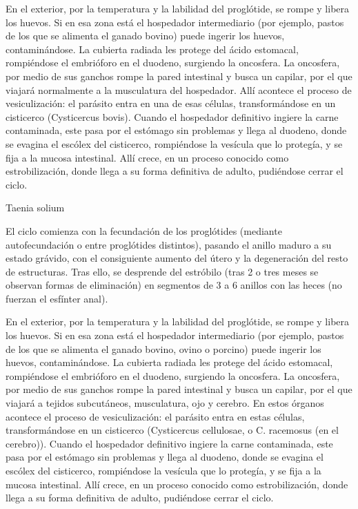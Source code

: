 En el exterior, por la temperatura y la labilidad del proglótide, se rompe y libera los huevos. Si en esa zona está el hospedador intermediario (por ejemplo, pastos de los que se alimenta el ganado bovino) puede ingerir los huevos, contaminándose. La cubierta radiada les protege del ácido estomacal, rompiéndose el embrióforo en el duodeno, surgiendo la oncosfera. La oncosfera, por medio de sus ganchos rompe la pared intestinal y busca un capilar, por el que viajará normalmente a la musculatura del hospedador. Allí acontece el proceso de vesiculización: el parásito entra en una de esas células, transformándose en un cisticerco (Cysticercus bovis). Cuando el hospedador definitivo ingiere la carne contaminada, este pasa por el estómago sin problemas y llega al duodeno, donde se evagina el escólex del cisticerco, rompiéndose la vesícula que lo protegía, y se fija a la mucosa intestinal. Allí crece, en un proceso conocido como estrobilización, donde llega a su forma definitiva de adulto, pudiéndose cerrar el ciclo.

Taenia solium

El ciclo comienza con la fecundación de los proglótides (mediante autofecundación o entre proglótides distintos), pasando el anillo maduro a su estado grávido, con el consiguiente aumento del útero y la degeneración del resto de estructuras. Tras ello, se desprende del estróbilo (tras 2 o tres meses se observan formas de eliminación) en segmentos de 3 a 6 anillos con las heces (no fuerzan el esfínter anal). 

En el exterior, por la temperatura y la labilidad del proglótide, se rompe y libera los huevos. Si en esa zona está el hospedador intermediario (por ejemplo, pastos de los que se alimenta el ganado bovino, ovino o porcino) puede ingerir los huevos, contaminándose. La cubierta radiada les protege del ácido estomacal, rompiéndose el embrióforo en el duodeno, surgiendo la oncosfera. La oncosfera, por medio de sus ganchos rompe la pared intestinal y busca un capilar, por el que viajará a tejidos subcutáneos, musculatura, ojo y cerebro. En estos órganos acontece el proceso de vesiculización: el parásito entra en estas células, transformándose en un cisticerco (Cysticercus cellulosae, o C. racemosus (en el cerebro)). Cuando el hospedador definitivo ingiere la carne contaminada, este pasa por el estómago sin problemas y llega al duodeno, donde se evagina el escólex del cisticerco, rompiéndose la vesícula que lo protegía, y se fija a la mucosa intestinal. Allí crece, en un proceso conocido como estrobilización, donde llega a su forma definitiva de adulto, pudiéndose cerrar el ciclo.

